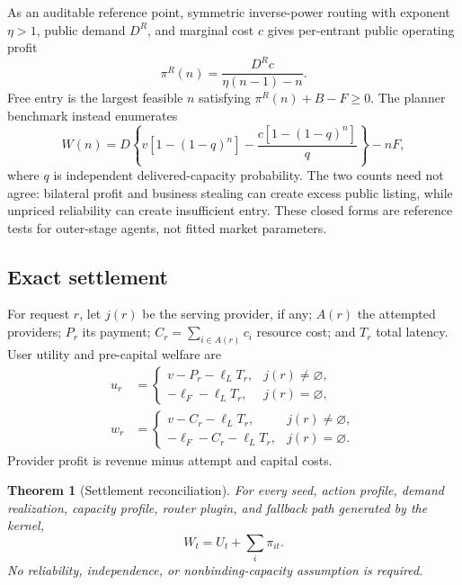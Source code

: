 \documentclass[10pt]{article}
\newtheorem{theorem}{Theorem}
\newcommand{\1}{\mathbf 1}
\begin{document}
As an auditable reference point, symmetric inverse-power routing with exponent
$\eta>1$, public demand $D^R$, and marginal cost $c$ gives per-entrant public
operating profit
\begin{equation}
 \pi^R(n)=\frac{D^R c}{\eta(n-1)-n}.
 \label{eq:entryprofit}
\end{equation}
Free entry is the largest feasible $n$ satisfying
$\pi^R(n)+B-F\ge0$.  The planner benchmark instead enumerates
\begin{equation}
 W(n)=D\left\{v[1-(1-q)^n]-\frac{c[1-(1-q)^n]}{q}\right\}-nF,
 \label{eq:entrywelfare-neurips}
\end{equation}
where $q$ is independent delivered-capacity probability.  The two counts need
not agree: bilateral profit and business stealing can create excess public
listing, while unpriced reliability can create insufficient entry.  These
closed forms are reference tests for outer-stage agents, not fitted market
parameters.

\subsection{Exact settlement}

For request $r$, let $j(r)$ be the serving provider, if any; $A(r)$ the attempted
providers; $P_r$ its payment; $C_r=\sum_{i\in A(r)}c_i$ resource cost; and $T_r$
total latency.  User utility and pre-capital welfare are
\begin{align}
u_r&=\begin{cases}v-P_r-\ell_LT_r,&j(r)\ne\varnothing,\\
-\ell_F-\ell_LT_r,&j(r)=\varnothing,
\end{cases}\\
w_r&=\begin{cases}v-C_r-\ell_LT_r,&j(r)\ne\varnothing,\\
-\ell_F-C_r-\ell_LT_r,&j(r)=\varnothing.
\end{cases}
\end{align}
Provider profit is revenue minus attempt and capital costs.

\begin{theorem}[Settlement reconciliation]
\label{thm:settlement}
For every seed, action profile, demand realization, capacity profile, router
plugin, and fallback path generated by the kernel,
\begin{equation}
W_t=U_t+\sum_i\pi_{it}.
\end{equation}
No reliability, independence, or nonbinding-capacity assumption is required.
\end{theorem}
\end{document}
